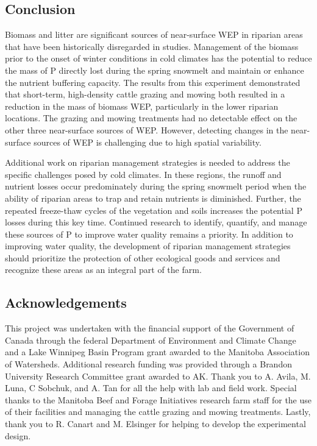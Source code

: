 \documentclass[
]{agujournal2019}
\begin{document}
\subsection{Conclusion}\label{conclusion}

Biomass and litter are significant sources of near-surface WEP in
riparian areas that have been historically disregarded in studies.
Management of the biomass prior to the onset of winter conditions in
cold climates has the potential to reduce the mass of P directly lost
during the spring snowmelt and maintain or enhance the nutrient
buffering capacity. The results from this experiment demonstrated that
short-term, high-density cattle grazing and mowing both resulted in a
reduction in the mass of biomass WEP, particularly in the lower riparian
locations. The grazing and mowing treatments had no detectable effect on
the other three near-surface sources of WEP. However, detecting changes
in the near-surface sources of WEP is challenging due to high spatial
variability.

Additional work on riparian management strategies is needed to address
the specific challenges posed by cold climates. In these regions, the
runoff and nutrient losses occur predominately during the spring
snowmelt period when the ability of riparian areas to trap and retain
nutrients is diminished. Further, the repeated freeze-thaw cycles of the
vegetation and soils increases the potential P losses during this key
time. Continued research to identify, quantify, and manage these sources
of P to improve water quality remains a priority. In addition to
improving water quality, the development of riparian management
strategies should prioritize the protection of other ecological goods
and services and recognize these areas as an integral part of the farm.

\subsection*{Acknowledgements}\label{acknowledgements}

This project was undertaken with the financial support of the Government
of Canada through the federal Department of Environment and Climate
Change and a Lake Winnipeg Basin Program grant awarded to the Manitoba
Association of Watersheds. Additional research funding was provided
through a Brandon University Research Committee grant awarded to AK.
Thank you to A. Avila, M. Luna, C Sobchuk, and A. Tan for all the help
with lab and field work. Special thanks to the Manitoba Beef and Forage
Initiatives research farm staff for the use of their facilities and
managing the cattle grazing and mowing treatments. Lastly, thank you to
R. Canart and M. Elsinger for helping to develop the experimental
design.
\end{document}
